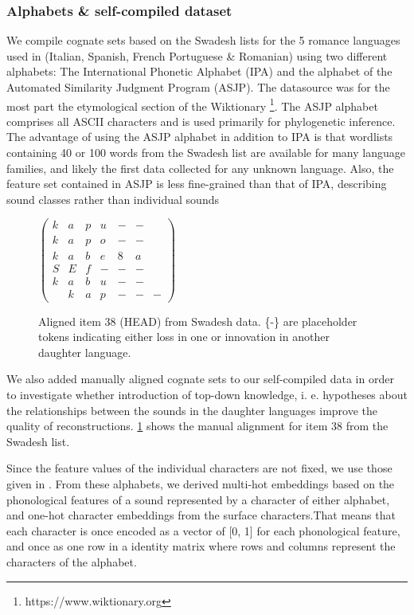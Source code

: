 \subsubsection{Alphabets \& self-compiled dataset}
We compile cognate sets based on the Swadesh lists \cite{swadesh_origin_1971} for the 5 romance languages used in \citet{ciobanu-dinu-2014-automatic} (Italian, Spanish, French Portuguese \& Romanian) using two
different alphabets: The International Phonetic Alphabet (IPA) and the alphabet of the Automated Similarity Judgment Program (ASJP). The datasource was for the most part the etymological section of the Wiktionary \footnote{https://www.wiktionary.org}.
The ASJP alphabet comprises all ASCII characters and is used primarily for phylogenetic inference. The advantage of using the ASJP alphabet in addition to IPA is that wordlists containing 40 or 100 words from the Swadesh list are available for many language families, and likely the first data collected for
any unknown language. Also, the feature set contained in ASJP is less fine-grained than that of IPA, describing sound classes rather than individual sounds

\begin{figure}
\centering
$\begin{pmatrix}
    k & a & p & u & - & - \\
    k & a & p & o & - & - \\ 
    k & a & b & e & 8 & a \\
    S & E & f & - & - & - \\
    k & a & b & u & - & - \\
    & k & a & p & - & - & - 
\end{pmatrix}$
\label{figure:alignment}
\caption{Aligned item 38 (HEAD) from Swadesh data. \{-\} are placeholder tokens indicating either loss in one or innovation in another daughter language.}
\end{figure}

We also added manually aligned cognate sets to our self-compiled data in order to investigate whether introduction of top-down knowledge, i. e. hypotheses about the relationships between the sounds in the daughter languages improve the quality of reconstructions. \ref{figure:alignment} shows the manual alignment for item 38 from the Swadesh list. 

Since the feature values of the individual
characters are not fixed, we use those given in \cite{brown_automated_2008}.
From these alphabets, we derived multi-hot
embeddings based on the phonological features of a sound represented by a character of either alphabet, and one-hot character embeddings from the surface characters.That means that each character is once encoded as a vector of [0, 1] for each phonological feature, and once as one row in a identity matrix 
where rows and columns represent the characters of the alphabet. 


